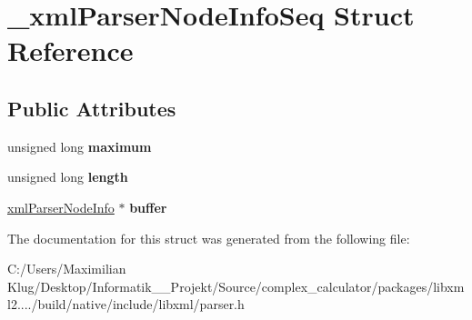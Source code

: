 \hypertarget{struct__xml_parser_node_info_seq}{}\section{\+\_\+xml\+Parser\+Node\+Info\+Seq Struct Reference}
\label{struct__xml_parser_node_info_seq}
\subsection*{Public Attributes}
\begin{DoxyCompactItemize}
\item 
\mbox{\label{struct__xml_parser_node_info_seq_aa8546837e510e099b0e8790700b9c8ff}} 
unsigned long {\bfseries maximum}
\item 
\mbox{\label{struct__xml_parser_node_info_seq_a09bd6c0f172702df82cfbef8b03f7e0a}} 
unsigned long {\bfseries length}
\item 
\mbox{\label{struct__xml_parser_node_info_seq_ada2d42841c64e792f483bab9451fdbd4}} 
\mbox{\hyperlink{struct__xml_parser_node_info}{xml\+Parser\+Node\+Info}} $\ast$ {\bfseries buffer}
\end{DoxyCompactItemize}


The documentation for this struct was generated from the following file\+:\begin{DoxyCompactItemize}
\item 
C\+:/\+Users/\+Maximilian Klug/\+Desktop/\+Informatik\+\_\+\_\+\+Projekt/\+Source/complex\+\_\+calculator/packages/libxml2..../build/native/include/libxml/parser.\+h\end{DoxyCompactItemize}
